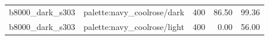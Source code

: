 \begin{longtable}{l>{\raggedright\arraybackslash}p{.42\linewidth}rrr}
b8000\_\allowbreak{}dark\_\allowbreak{}s303 & %
palette:navy\_\allowbreak{}coolrose/dark & %
400 & %
86.50 & %
99.36 \\ %

b8000\_\allowbreak{}dark\_\allowbreak{}s303 & %
palette:navy\_\allowbreak{}coolrose/light & %
400 & %
0.00 & %
56.00 \\ %


\end{longtable}
